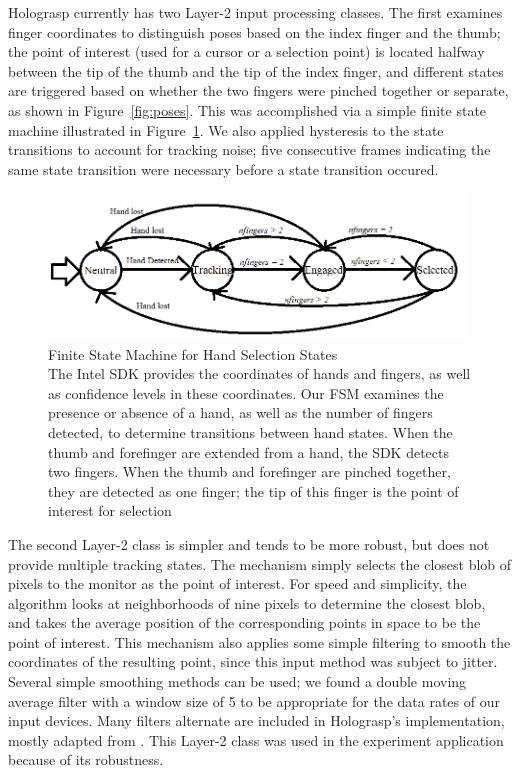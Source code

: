 \documentclass[pageno]{jpaper}
\begin{document}
Holograsp currently has two Layer-2 input processing classes. The first examines finger coordinates to distinguish poses based
on the index finger and the thumb; the point of interest (used for a cursor or a selection point) is located halfway between the tip
of the thumb and the tip of the index finger, and different states are triggered based on whether the two fingers were pinched
together or separate, as shown in Figure~\ref{fig:poses}. This was accomplished via a simple finite state machine illustrated in Figure~\ref{fig:fsm}. We also
applied hysteresis to the state transitions to account for tracking noise; five consecutive frames indicating the same state transition
were necessary before a state transition occured.

\begin{figure}[h]
\centering
\includegraphics[width=0.99\textwidth]{figures/fsm.png}
\caption{Finite State Machine for Hand Selection States\\
The Intel SDK provides the coordinates of hands and fingers, as well as confidence levels in these coordinates. Our FSM
examines the presence or absence of a hand, as well as the number of fingers detected, to determine transitions between
hand states. When the thumb and forefinger are extended from a hand, the SDK detects two fingers. 
When the thumb and forefinger are pinched together, they are detected as one finger; the tip of this finger is the point
of interest for selection}
\label{fig:fsm}
\end{figure}

The second Layer-2 class is simpler and tends to be more robust, but does not provide multiple tracking states. The mechanism simply selects the closest blob of pixels to the monitor
as the point of interest. For speed and simplicity, the algorithm looks at neighborhoods of nine pixels to determine the closest blob,
and takes the average position of the corresponding points in space to be the point of interest. This mechanism also applies some simple filtering to
smooth the coordinates of the resulting point, since this input method was subject to jitter. Several simple
smoothing methods can be used; we found a double moving average filter with a window size of 5 to be appropriate for the data rates of
our input devices. Many filters alternate are included in Holograsp's implementation, mostly adapted from \cite{brown2004smoothing}. This Layer-2 class was
used in the experiment application because of its robustness.
\end{document}
